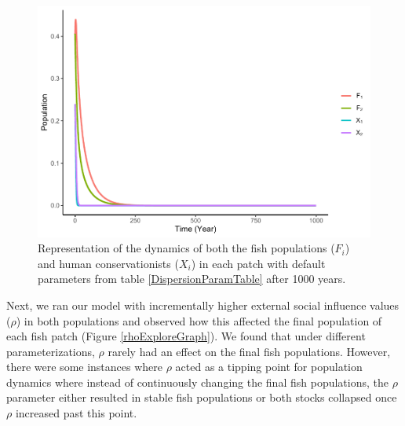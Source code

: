 \documentclass[
  12pt,
]{article}
\begin{document}
\begin{figure}
\centering
\includegraphics{Wulfing_Thesis_files/figure-latex/DispersionScenario-1.pdf}
\caption{\label{fig:DispersionScenario}Representation of the dynamics of both the fish populations (\(F_i\)) and human conservationists (\(X_i\)) in each patch with default parameters from table \ref{DispersionParamTable} after 1000 years. \label{DispersionScenario}}
\end{figure}

Next, we ran our model with incrementally higher external social influence values (\(\rho\)) in both populations and observed how this affected the final population of each fish patch (Figure \ref{rhoExploreGraph}). We found that under different parameterizations, \(\rho\) rarely had an effect on the final fish populations. However, there were some instances where \(\rho\) acted as a tipping point for population dynamics where instead of continuously changing the final fish populations, the \(\rho\) parameter either resulted in stable fish populations or both stocks collapsed once \(\rho\) increased past this point.
\end{document}
